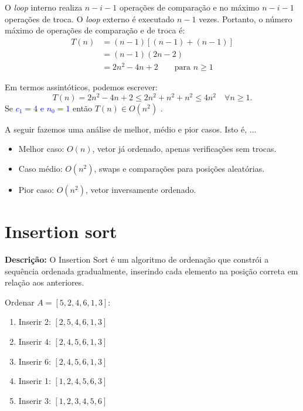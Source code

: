 O \textit{loop} interno realiza $n-i-1$ operações de comparação e no máximo $n-i-1$ operações de troca. O \textit{loop} externo é executado $n-1$ vezes. Portanto, o número máximo de operações de comparação e de troca é:
\begin{align*}
T(n) & = (n-1) [(n-1) + (n-1)]\\
     & = (n-1) (2n-2)\\
     & = 2n^2 - 4n + 2   \quad\quad \text{para } n\geq 1 
\end{align*}

Em termos assintóticos, podemos escrever:
$$T(n)=2n^2 - 4n + 2 \leq 2n^2 + n^2 + n^2 \leq 4n^2\quad \forall n\geq 1.$$
Se \textcolor{blue}{$c_1=4$ e $n_0=1$} então $T(n)\in O(n^2)$ . 

A seguir fazemos uma análise de melhor, médio e pior casos. Isto é, ...
\begin{itemize}
    \item Melhor caso: $O(n)$, vetor já ordenado, apenas verificações sem trocas.

     \item Caso médio: $O(n^2)$, swaps e comparações para posições aleatórias.

     \item Pior caso: $O(n^2)$, vetor inversamente ordenado.
\end{itemize}


\section{Insertion sort}
\textbf{Descrição:} O Insertion Sort é um algoritmo de ordenação que constrói a sequência ordenada gradualmente, inserindo cada elemento na posição correta em relação aos anteriores.

\begin{exmp}
Ordenar $A = [5, 2, 4, 6, 1, 3]$:

\begin{enumerate}
    \item Inserir 2: $[2,5,4,6,1,3]$
    \item Inserir 4: $[2,4,5,6,1,3]$
    \item Inserir 6: $[2,4,5,6,1,3]$
    \item Inserir 1: $[1,2,4,5,6,3]$
    \item Inserir 3: $[1,2,3,4,5,6]$
\end{enumerate}

\end{exmp}

